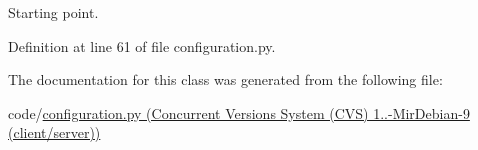 Starting point. 



Definition at line 61 of file configuration.\-py.



The documentation for this class was generated from the following file\-:\begin{DoxyCompactItemize}
\item 
code/\hyperlink{configuration_8py}{configuration.\-py (\-Concurrent Versions System (\-C\-V\-S) 1..-\/\-Mir\-Debian-\/9 (client/server))}\end{DoxyCompactItemize}
